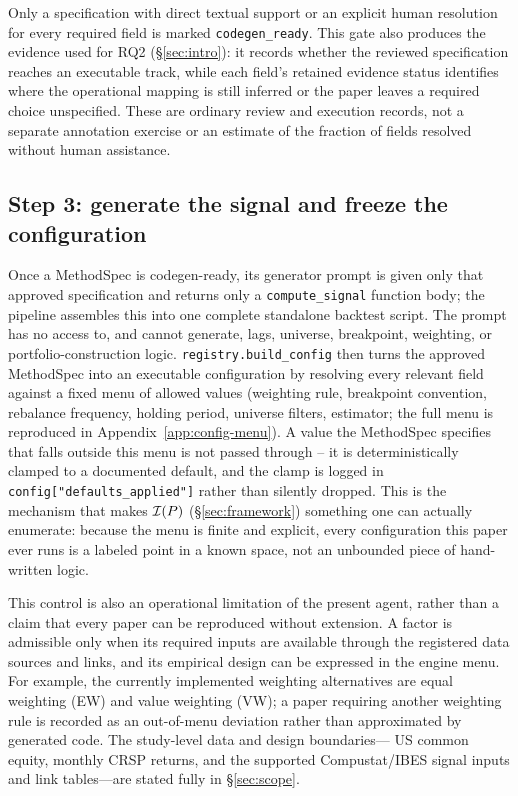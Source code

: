 Only a specification with direct textual support or an explicit human
resolution for every required field is marked \texttt{codegen\_ready}. This
gate also produces the evidence used for RQ2 (\S\ref{sec:intro}): it records
whether the reviewed specification reaches an executable track, while each
field's retained evidence status identifies where the operational mapping is
still inferred or the paper leaves a required choice unspecified. These are
ordinary review and execution records, not a separate annotation exercise or
an estimate of the fraction of fields resolved without human assistance.

\subsection{Step 3: generate the signal and freeze the configuration}

Once a MethodSpec is codegen-ready, its generator prompt is given only that
approved specification and returns only a \texttt{compute\_signal} function
body; the pipeline assembles this into one complete standalone backtest
script. The prompt has no access to, and cannot generate, lags, universe,
breakpoint, weighting, or portfolio-construction logic.
\texttt{registry.build\_config} then turns the approved MethodSpec
into an executable configuration by resolving every relevant field against
a fixed menu of allowed values (weighting rule, breakpoint convention,
rebalance frequency, holding period, universe filters, estimator; the full
menu is reproduced in Appendix~\ref{app:config-menu}). A value the MethodSpec
specifies that falls outside this menu is not passed through -- it is
deterministically clamped to a documented default, and the clamp is logged
in \texttt{config["defaults\_applied"]} rather than silently dropped. This
is the mechanism that makes $\mathcal{I}(P)$ (\S\ref{sec:framework})
something one can actually enumerate: because the menu is finite and
explicit, every configuration this paper ever runs is a labeled point in a
known space, not an unbounded piece of hand-written logic.

This control is also an operational limitation of the present agent, rather
than a claim that every paper can be reproduced without extension. A factor is
admissible only when its required inputs are available through the registered
data sources and links, and its empirical design can be expressed in the
engine menu. For example, the currently implemented weighting alternatives are
equal weighting (EW) and value weighting (VW); a paper requiring another
weighting rule is recorded as an out-of-menu deviation rather than
approximated by generated code. The study-level data and design boundaries---
US common equity, monthly CRSP returns, and the supported Compustat/IBES
signal inputs and link tables---are stated fully in \S\ref{sec:scope}.

